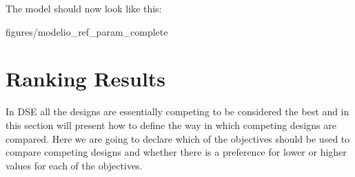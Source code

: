 \documentclass[11pt,a4paper]{../tutorial}
\begin{document}
\begin{instructions}
The model should now look like this:

\begin{center}
\begin{annotation}[width=0.7\linewidth]{figures/modelio_ref_param_complete}
    \end{annotation}
\end{center}

\end{instructions}




\newpage
\section{Ranking Results}

In DSE all the designs are essentially competing to be considered the best and in this section will present how to define the way in which competing designs are compared.  Here we are going to declare which of the objectives should be used to compare competing designs and whether there is a preference for lower or higher values for each of the objectives.
\end{document}
